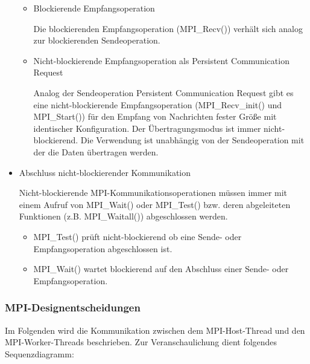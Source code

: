 \begin{itemize}
\begin{itemize}
		      \item Blockierende Empfangsoperation

		            Die blockierenden Empfangsoperation (MPI\_Recv()) verhält sich analog zur blockierenden Sendeoperation.

		      \item Nicht-blockierende Empfangsoperation als Persistent Communication Request

		            Analog der Sendeoperation Persistent Communication Request gibt es eine nicht-blockierende Empfangsoperation (MPI\_Recv\_init() und MPI\_Start()) für den Empfang von Nachrichten fester Größe mit identischer Konfiguration. Der Übertragungsmodus ist immer nicht-blockierend. Die Verwendung ist unabhängig von der Sendeoperation mit der die Daten übertragen werden.

	      \end{itemize}

	\item Abschluss nicht-blockierender Kommunikation

	      Nicht-blockierende MPI-Kommunikationsoperationen müssen immer mit einem Aufruf von MPI\_Wait() oder MPI\_Test() bzw. deren abgeleiteten Funktionen (z.B. MPI\_Waitall()) abgeschlossen werden.

	      \begin{itemize}
		      \item MPI\_Test() prüft nicht-blockierend ob eine Sende- oder Empfangsoperation abgeschlossen ist.

		      \item MPI\_Wait() wartet blockierend auf den Abschluss einer Sende- oder Empfangsoperation.
	      \end{itemize}

\end{itemize}

\subsubsection{MPI-Designentscheidungen}
Im Folgenden wird die Kommunikation zwischen dem MPI-Host-Thread und den MPI-Worker-Threads beschrieben. Zur Veranschaulichung dient folgendes Sequenzdiagramm:
\\ \\

